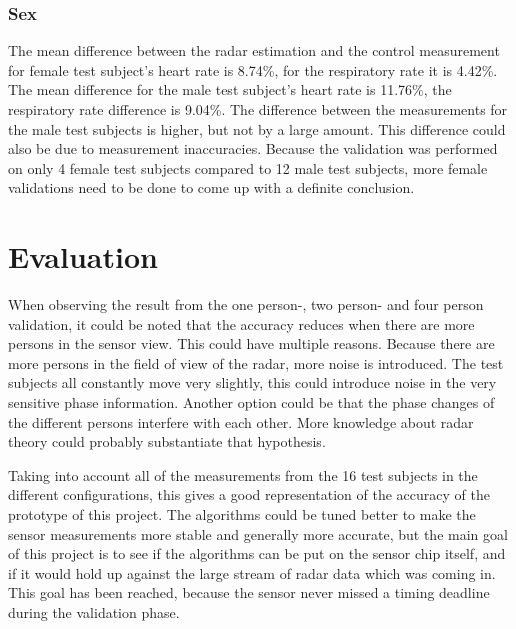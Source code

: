 \subsubsection{Sex}
The mean difference between the radar estimation and the control measurement for female test subject's heart rate is 8.74\%, for the respiratory rate it is 4.42\%. The mean difference for the male test subject's heart rate is 11.76\%, the respiratory rate difference is 9.04\%. The difference between the measurements for the male test subjects is higher, but not by a large amount. This difference could also be due to measurement inaccuracies. Because the validation was performed on only 4 female test subjects compared to 12 male test subjects, more female validations need to be done to come up with a definite conclusion.

\section{Evaluation}
When observing the result from the one person-, two person- and four person validation, it could be noted that the accuracy reduces when there are more persons in the sensor view. This could have multiple reasons. Because there are more persons in the field of view of the radar, more noise is introduced. The test subjects all constantly move very slightly, this could introduce noise in the very sensitive phase information. Another option could be that the phase changes of the different persons interfere with each other. More knowledge about radar theory could probably substantiate that hypothesis.

Taking into account all of the measurements from the 16 test subjects in the different configurations, this gives a good representation of the accuracy of the prototype of this project. The algorithms could be tuned better to make the sensor measurements more stable and generally more accurate, but the main goal of this project is to see if the algorithms can be put on the sensor chip itself, and if it would hold up against the large stream of radar data which was coming in. This goal has been reached, because the sensor never missed a timing deadline during the validation phase.